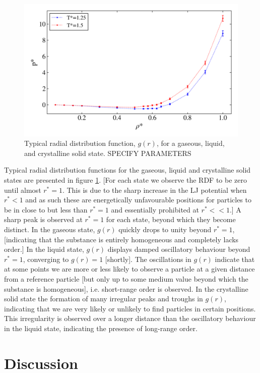 \documentclass[10pt, twocolumn]{revtex4}    %
\begin{document}
\begin{figure}
	\includegraphics[width=\linewidth]{figures/excessEnergyPressure/excessPressure.png}
	\caption{Typical radial distribution function, $g(r)$, for a gaseous, liquid, and crystalline solid state. SPECIFY PARAMETERS}
	\label{fig:RDFs}
\end{figure}

Typical radial distribution functions for the gaseous, liquid and crystalline solid states are presented in figure \ref{fig:RDFs}. [For each state we observe the RDF to be zero until almost $r^{*}=1$. This is due to the sharp increase in the LJ potential when $r^{*}<1$ and as such these are energetically unfavourable positions for particles to be in close to but less than $r^{*}=1$ and essentially prohibited at $r^{*}<<1$.] A sharp peak is observed at $r^{*}=1$ for each state, beyond which they become distinct. In the gaseous state, $g(r)$ quickly drops to unity beyond $r^{*}=1$, [indicating that the substance is entirely homogeneous and completely lacks order.] In the liquid state, $g(r)$ displays damped oscillatory behaviour beyond $r^{*}=1$, converging to $g(r)=1$ [shortly]. The oscillations in $g(r)$ indicate that at some points we are more or less likely to observe a particle at a given distance from a reference particle [but only up to some medium value beyond which the substance is homogeneous], i.e. short-range order is observed. In the crystalline solid state the formation of many irregular peaks and troughs in $g(r)$, indicating that we are very likely or unlikely to find particles in certain positions. This irregularity is observed over a longer distance than the oscillatory behaviour in the liquid state, indicating the presence of long-range order.


\section{Discussion} \label{s:analysis}
\end{document}

